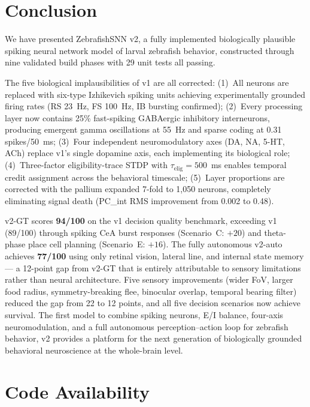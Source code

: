 \documentclass[11pt,a4paper]{article}
\begin{document}
\section{Conclusion}\label{sec:conclusion}

We have presented ZebrafishSNN v2, a fully implemented biologically
plausible spiking neural network model of larval zebrafish behavior,
constructed through nine validated build phases with 29 unit tests
all passing.

The five biological implausibilities of v1 are all corrected:
(1)~All neurons are replaced with six-type Izhikevich spiking units
achieving experimentally grounded firing rates (RS 23~Hz, FS 100~Hz,
IB bursting confirmed);
(2)~Every processing layer now contains 25\% fast-spiking GABAergic
inhibitory interneurons, producing emergent gamma oscillations at
55~Hz and sparse coding at 0.31 spikes/50~ms;
(3)~Four independent neuromodulatory axes (DA, NA, 5-HT, ACh) replace
v1's single dopamine axis, each implementing its biological role;
(4)~Three-factor eligibility-trace STDP with $\tau_\mathrm{elig}=500$~ms
enables temporal credit assignment across the behavioral timescale;
(5)~Layer proportions are corrected with the pallium expanded 7-fold
to 1,050 neurons, completely eliminating signal death (PC\_int RMS
improvement from 0.002 to 0.48).

v2-GT scores \textbf{94/100} on the v1 decision quality benchmark,
exceeding v1 (89/100) through spiking CeA burst responses (Scenario~C:
$+20$) and theta-phase place cell planning (Scenario~E: $+16$).
The fully autonomous v2-auto achieves \textbf{77/100} using only retinal
vision, lateral line, and internal state memory --- a 12-point gap from
v2-GT that is entirely attributable to sensory limitations rather than
neural architecture.
Five sensory improvements (wider FoV, larger food radius, symmetry-breaking
flee, binocular overlap, temporal bearing filter) reduced the gap from
22 to 12 points, and all five decision scenarios now achieve survival.
The first model to combine spiking neurons, E/I balance, four-axis
neuromodulation, and a full autonomous perception--action loop for
zebrafish behavior, v2 provides a platform for the next generation of
biologically grounded behavioral neuroscience at the whole-brain level.

\section{Code Availability}
\end{document}
